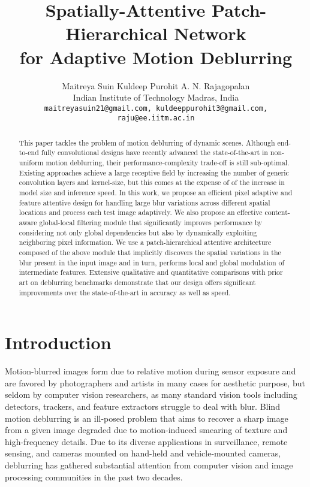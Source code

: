 \documentclass[10pt,twocolumn,letterpaper]{article}
\begin{document}
\title{Spatially-Attentive Patch-Hierarchical Network\\ for Adaptive Motion Deblurring}

\author{Maitreya Suin \qquad Kuldeep Purohit \qquad A. N. Rajagopalan \\
Indian Institute of Technology Madras, India\\
{\tt\small maitreyasuin21@gmail.com, kuldeeppurohit3@gmail.com, raju@ee.iitm.ac.in}
} 

\maketitle


\begin{abstract}
This paper tackles the problem of motion deblurring of dynamic scenes. Although end-to-end fully convolutional designs have recently advanced the state-of-the-art in non-uniform motion deblurring, their performance-complexity trade-off is still sub-optimal. Existing approaches achieve a large receptive field by increasing the number of generic convolution layers and kernel-size, but this comes at the expense of of the increase in model size and inference speed. In this work, we propose an efficient pixel adaptive and feature attentive design for handling large blur variations across different spatial locations and process each test image adaptively. We also propose an effective content-aware global-local filtering module that significantly improves performance by considering not only global dependencies but also by dynamically exploiting neighboring pixel information. We use a patch-hierarchical attentive architecture composed of the above module that implicitly discovers the spatial variations in the blur present in the input image and in turn, performs local and global modulation of intermediate features. Extensive qualitative and quantitative comparisons with prior art on deblurring benchmarks demonstrate that our design offers significant improvements over the state-of-the-art in accuracy as well as speed.

\end{abstract}

\section{Introduction}
Motion-blurred images form due to relative motion during sensor exposure and are favored by photographers and artists in many cases for aesthetic purpose, but seldom by computer vision researchers, as many standard vision tools including detectors, trackers, and feature extractors struggle to deal with blur. Blind motion deblurring is an ill-posed problem that aims to recover a sharp image from a given image degraded due to motion-induced smearing of texture and high-frequency details. Due to its diverse applications in surveillance, remote sensing, and cameras mounted on hand-held and vehicle-mounted cameras, deblurring has gathered substantial attention from computer vision and image processing communities in the past two decades. 
\end{document}
